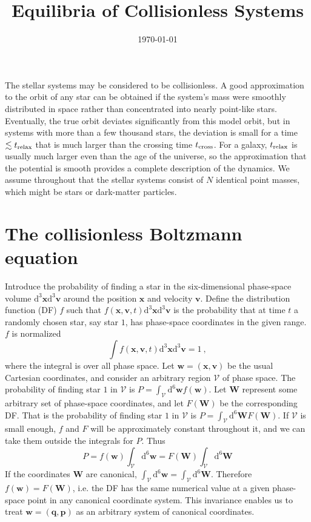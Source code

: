 \documentclass[12pt,a4paper]{article}
\title{Equilibria of Collisionless Systems}
\author{}
\date{\today}
\renewcommand{\vec}[1]{\boldsymbol{#1}}
\newcommand{\dif}{\mathrm{d}}
\begin{document}
\maketitle

\cite{2008gady.book.....B}  The stellar systems may be considered to be collisionless. A good approximation to the orbit of any star can be obtained if the system's mass were smoothly distributed in space rather than concentrated into nearly point-like stars. Eventually, the true orbit deviates significantly from this model orbit, but in systems with more than a few thousand stars, the deviation is small for a time $\lesssim t_{\rm relax}$ that is much larger than the crossing time $t_{\rm cross}$. For a galaxy, $t_{\rm relax}$ is usually much larger even than the age of the universe, so the approximation that the potential is smooth provides a complete description of the dynamics. We assume throughout that the stellar systems consist of $N$ identical point masses, which might be stars or dark-matter particles.

\section{The collisionless Boltzmann equation}
Introduce the probability of finding a star in the six-dimensional phase-space volume $\dif^3 \vec{x} \dif^3 \vec{v}$ around the position $\vec{x}$ and velocity $\vec{v}$. Define the distribution function (DF) $f$ such that $f(\vec{x}, \vec{v}, t) \dif^3 \vec{x} \dif^3 \vec{v}$ is the probability that at time $t$ a randomly chosen star, say star $1$, has phase-space coordinates in the given range. $f$ is normalized
\begin{equation}
\int f(\vec{x}, \vec{v}, t) \dif^3 \vec{x} \dif^3 \vec{v} = 1 ~,
\end{equation}
where the integral is over all phase space. Let $\vec{w} = (\vec{x}, \vec{v})$ be the usual Cartesian coordinates, and consider an arbitrary  region $\mathcal V$ of phase space. The probability of finding star $1$ in $\mathcal V$ is $P = \int_{\mathcal V} \dif^6 \vec{w} f(\vec{w})$. Let $\vec{W}$ represent some arbitrary set of phase-space coordinates,  and let $F(\vec{W})$ be the corresponding DF. That is the probability of finding star $1$ in $\mathcal V$ is $P = \int_{\mathcal V} \dif^6 \vec{W} F(\vec{W})$. If $\mathcal V$ is small enough, $f$ and $F$ will be approximately constant throughout it, and we can take them outside the integrals for $P$. Thus
\begin{equation}
P = f(\vec{w}) \int_{\mathcal V} \dif^6 \vec{w} = F(\vec{W}) \int_{\mathcal V} \dif^6 \vec{W} 
\end{equation}
If the coordinates $\vec{W}$ are canonical, $\int_{\mathcal V} \dif^6 \vec{w} = \int_{\mathcal V} \dif^6 \vec{W}$. Therefore $f(\vec{w}) = F(\vec{W})$, i.e. the DF has the same numerical value at a given phase-space point in any canonical coordinate system. This invariance enables us to treat $\vec{w} = (\vec{q}, \vec{p})$ as an arbitrary system of canonical coordinates.
\end{document}

